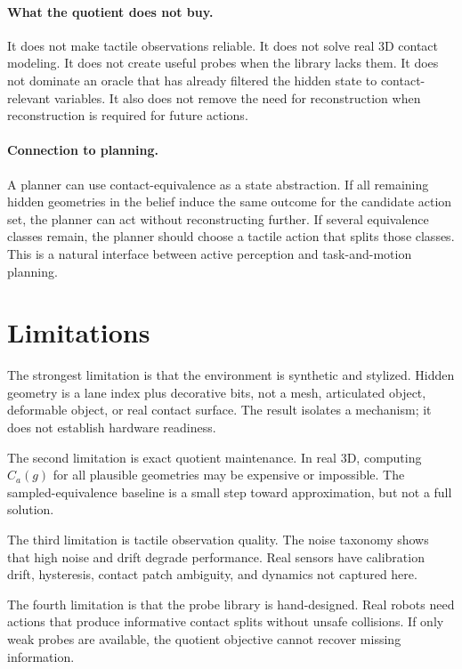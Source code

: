 \documentclass{article}
\begin{document}
\paragraph{What the quotient does not buy.}
It does not make tactile observations reliable. It does not solve real 3D contact modeling. It does not create useful probes when the library lacks them. It does not dominate an oracle that has already filtered the hidden state to contact-relevant variables. It also does not remove the need for reconstruction when reconstruction is required for future actions.

\paragraph{Connection to planning.}
A planner can use contact-equivalence as a state abstraction. If all remaining hidden geometries in the belief induce the same outcome for the candidate action set, the planner can act without reconstructing further. If several equivalence classes remain, the planner should choose a tactile action that splits those classes. This is a natural interface between active perception and task-and-motion planning.

\section{Limitations}

The strongest limitation is that the environment is synthetic and stylized. Hidden geometry is a lane index plus decorative bits, not a mesh, articulated object, deformable object, or real contact surface. The result isolates a mechanism; it does not establish hardware readiness.

The second limitation is exact quotient maintenance. In real 3D, computing $C_a(g)$ for all plausible geometries may be expensive or impossible. The sampled-equivalence baseline is a small step toward approximation, but not a full solution.

The third limitation is tactile observation quality. The noise taxonomy shows that high noise and drift degrade performance. Real sensors have calibration drift, hysteresis, contact patch ambiguity, and dynamics not captured here.

The fourth limitation is that the probe library is hand-designed. Real robots need actions that produce informative contact splits without unsafe collisions. If only weak probes are available, the quotient objective cannot recover missing information.
\end{document}
